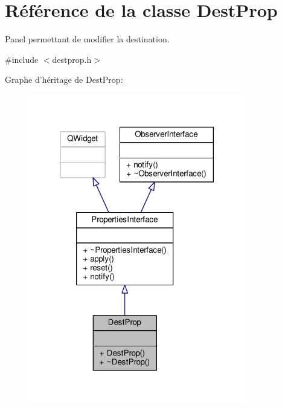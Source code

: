\hypertarget{classDestProp}{\section{Référence de la classe Dest\+Prop}
\label{classDestProp}
}


Panel permettant de modifier la destination.  




{\ttfamily \#include $<$destprop.\+h$>$}



Graphe d'héritage de Dest\+Prop\+:
\nopagebreak
\begin{figure}[H]
\begin{center}
\leavevmode
\includegraphics[width=269pt]{d4/d2d/classDestProp__inherit__graph}
\end{center}
\end{figure}


